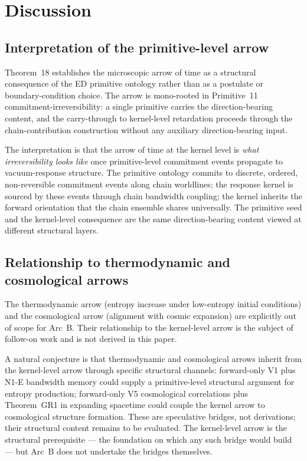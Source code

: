 \documentclass[11pt,a4paper]{article}
\begin{document}
\section{Discussion}

\subsection{Interpretation of the primitive-level arrow}

Theorem~18 establishes the microscopic arrow of time as a structural consequence of the ED primitive ontology rather than as a postulate or boundary-condition choice. The arrow is mono-rooted in Primitive~11 commitment-irreversibility: a single primitive carries the direction-bearing content, and the carry-through to kernel-level retardation proceeds through the chain-contribution construction without any auxiliary direction-bearing input.

The interpretation is that the arrow of time at the kernel level is \emph{what irreversibility looks like} once primitive-level commitment events propagate to vacuum-response structure. The primitive ontology commits to discrete, ordered, non-reversible commitment events along chain worldlines; the response kernel is sourced by these events through chain bandwidth coupling; the kernel inherits the forward orientation that the chain ensemble shares universally. The primitive seed and the kernel-level consequence are the same direction-bearing content viewed at different structural layers.

\subsection{Relationship to thermodynamic and cosmological arrows}

The thermodynamic arrow (entropy increase under low-entropy initial conditions) and the cosmological arrow (alignment with cosmic expansion) are explicitly out of scope for Arc~B. Their relationship to the kernel-level arrow is the subject of follow-on work and is not derived in this paper.

A natural conjecture is that thermodynamic and cosmological arrows inherit from the kernel-level arrow through specific structural channels: forward-only V1 plus N1-E bandwidth memory could supply a primitive-level structural argument for entropy production; forward-only V5 cosmological correlations plus Theorem~GR1 in expanding spacetime could couple the kernel arrow to cosmological structure formation. These are speculative bridges, not derivations; their structural content remains to be evaluated. The kernel-level arrow is the structural prerequisite --- the foundation on which any such bridge would build --- but Arc~B does not undertake the bridges themselves.
\end{document}
